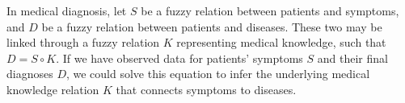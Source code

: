 \begin{example}
    In medical diagnosis, let $S$ be a fuzzy relation between patients and symptoms, and $D$ be a fuzzy relation between patients and diseases. These two may be linked through a fuzzy relation $K$ representing medical knowledge, such that $D = S \circ K$. If we have observed data for patients' symptoms $S$ and their final diagnoses $D$, we could solve this equation to infer the underlying medical knowledge relation $K$ that connects symptoms to diseases.
\end{example}